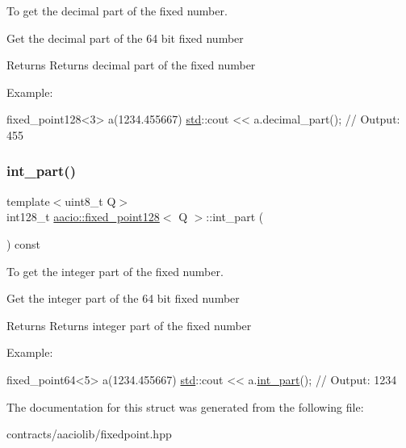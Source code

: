 To get the decimal part of the fixed number. 

Get the decimal part of the 64 bit fixed number \begin{DoxyReturn}{Returns}
Returns decimal part of the fixed number
\end{DoxyReturn}
Example\+: 
\begin{DoxyCode}
fixed\_point128<3> a(1234.455667)
\mbox{\hyperlink{namespacestd}{std}}::cout << a.decimal\_part(); \textcolor{comment}{// Output: 455}
\end{DoxyCode}
 \mbox{\label{structaacio_1_1fixed__point128_afa6c34544131eade5edfab1888f31e58}} 
\subsubsection{\texorpdfstring{int\+\_\+part()}{int\_part()}}
{\footnotesize\ttfamily template$<$uint8\+\_\+t Q$>$ \\
int128\+\_\+t \mbox{\hyperlink{structaacio_1_1fixed__point128}{aacio\+::fixed\+\_\+point128}}$<$ Q $>$\+::int\+\_\+part (\begin{DoxyParamCaption}{ }\end{DoxyParamCaption}) const\hspace{0.3cm}{\ttfamily [inline]}}



To get the integer part of the fixed number. 

Get the integer part of the 64 bit fixed number \begin{DoxyReturn}{Returns}
Returns integer part of the fixed number
\end{DoxyReturn}
Example\+: 
\begin{DoxyCode}
fixed\_point64<5> a(1234.455667)
\mbox{\hyperlink{namespacestd}{std}}::cout << a.\mbox{\hyperlink{structaacio_1_1fixed__point128_afa6c34544131eade5edfab1888f31e58}{int\_part}}(); \textcolor{comment}{// Output: 1234}
\end{DoxyCode}
 

The documentation for this struct was generated from the following file\+:\begin{DoxyCompactItemize}
\item 
contracts/aaciolib/fixedpoint.\+hpp\end{DoxyCompactItemize}
